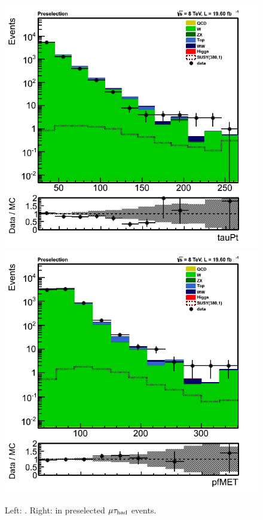 \begin{figure}[!Hhtb]
\centering
\includegraphics[angle=0,scale=0.35]{SelectionMuTau/tauPt_muTau.png}
\includegraphics[angle=0,scale=0.35]{SelectionMuTau/pfMET_muTau.png}
\caption{Left: \Tau\PT. Right: \MPT in preselected $\mu\tau_{\rm had}$ events.}
\label{fig:datamcmuotau}
\end{figure}

